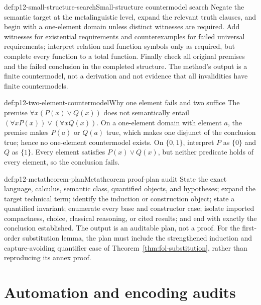 \begin{hbmethod}{def:p12-small-structure-search}{Small-structure countermodel search}
Negate the semantic target at the metalinguistic level, expand the relevant
truth clauses, and begin with a one-element domain unless distinct witnesses
are required.  Add witnesses for existential requirements and counterexamples
for failed universal requirements; interpret relation and function symbols
only as required, but complete every function to a total function.  Finally
check all original premises and the failed conclusion in the completed
structure.  The method's output is a finite countermodel, not a derivation and
not evidence that all invalidities have finite countermodels.
\end{hbmethod}

\begin{hbexample}{def:p12-two-element-countermodel}{Why one element fails and two suffice}
The premise \(\forall x(P(x)\lor Q(x))\) does not semantically entail
\((\forall xP(x))\lor(\forall xQ(x))\).  On a one-element domain with element
\(a\), the premise makes \(P(a)\) or \(Q(a)\) true, which makes one disjunct of
the conclusion true; hence no one-element countermodel exists.  On
\(\{0,1\}\), interpret \(P\) as \(\{0\}\) and \(Q\) as \(\{1\}\).  Every
element satisfies \(P(x)\lor Q(x)\), but neither predicate holds of every
element, so the conclusion fails.
\end{hbexample}

\begin{hbmethod}{def:p12-metatheorem-plan}{Metatheorem proof-plan audit}
State the exact language, calculus, semantic class, quantified objects, and
hypotheses; expand the target technical term; identify the induction or
construction object; state a quantified invariant; enumerate every base and
constructor case; isolate imported compactness, choice, classical reasoning,
or cited results; and end with exactly the conclusion established.  The output
is an auditable plan, not a proof.  For the first-order substitution lemma, the
plan must include the strengthened induction and capture-avoiding quantifier
case of Theorem~\ref{thm:fol-substitution}, rather than reproducing its
annex proof.
\end{hbmethod}

\section{Automation and encoding audits}

